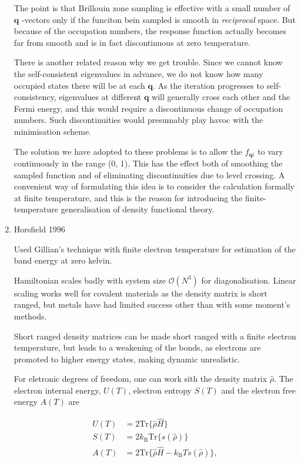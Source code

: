 \documentclass[11pt]{article}
\begin{document}
\begin{enumerate}
The point is that Brillouin zone sampling is effective with a small number of
\(\mathbf{q}\) -vectors only if the funciton bein sampled is smooth in
\emph{reciprocal} space. But because of the occupation numbers, the response
function actually becomes far from smooth and is in fact discontinuous at zero
temperature. 

There is another related reason why we get trouble. Since we cannot know the
self-consistent eigenvalues in advance, we do not know how many occupied states
there will be at each \(\mathbf{q}\). As the iteration progresses to self-consistency, eigenvalues at
different \(\mathbf{q}\) will generally cross each other and the Fermi energy, and this would require
a discontinuous change of occupation numbers. Such discontinuities would presumably
play havoc with the minimisation scheme. 

The solution we have adopted to these problems is to allow the \(f_{\mathbf{q}i}\) to vary
continuously in the range (0, 1). This has the effect both of smoothing the sampled
function and of eliminating discontinuities due to level crossing. A convenient way of
formulating this idea is to consider the calculation formally at finite temperature, and
this is the reason for introducing the finite-temperature generalisation of
density functional theory. 

\item Horsfield 1996
\label{sec:orge3d424d}
\cite{Horsfield1996}

Used Gillian's technique \cite{Gillan1989} with finite electron temperature for estimation of
the band energy at zero kelvin. 


Hamiltonian scales badly with system size \(\mathcal{O}(N^3)\) for
diagonalisation. Linear scaling works well for covalent materials as the
density matrix is short ranged, but metals have had limited success other than
with some moment's methods.

Short ranged density matrices can be made short ranged with a finite electron
temperature, but leads to a weakening of the bonds, as electrons are promoted
to higher energy states, making dynamic unrealistic. 

For eletronic degrees of freedom, one can work sith the density matrix
\(\hat{\rho}\). The electron internal energy, \(U(T)\), electron entropy \(S(T)\)
and the electron free energy \(A(T)\) are 

\begin{LaTeX}
\begin{align}
U(T) &= 2 \text{Tr}\{ \hat{\rho} \hat{H} \} \\
S(T) &= 2 k_{\text{B}} \text{Tr}\{ s( \hat{\rho} ) \} \\
A(T) &= 2 \text{Tr}\{ \hat{\rho} \hat{H} - k_{\text{B}} T s( \hat{\rho} ) \},
\end{align}
\end{LaTeX}


\end{enumerate}
\end{document}
